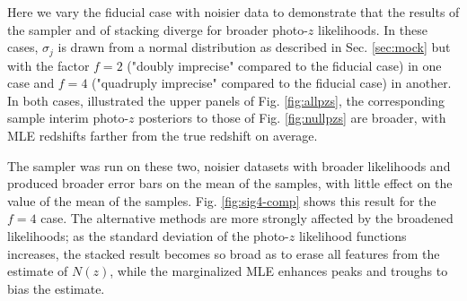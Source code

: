 \documentclass[preprint]{aastex}
\begin{document}
Here we vary the fiducial case with noisier data to demonstrate that the 
results of the sampler and of stacking diverge for broader photo-$z$ 
likelihoods.  In these cases, $\sigma_{j}$ is drawn from a normal distribution 
as described in Sec. \ref{sec:mock} but with the factor $f=2$ ("doubly 
imprecise" compared to the fiducial case) in one case and $f=4$ ("quadruply 
imprecise" compared to the fiducial case) in another.  In both cases, 
illustrated the upper panels of Fig. \ref{fig:allpzs}, the corresponding sample 
interim photo-$z$ posteriors to those of Fig. \ref{fig:nullpzs} are broader, 
with MLE redshifts farther from the true redshift on average.

The sampler was run on these two, noisier datasets with broader likelihoods and 
produced broader error bars on the mean of the samples, with little effect on 
the value of the mean of the samples.  Fig. \ref{fig:sig4-comp} shows this 
result for the $f=4$ case.  The alternative methods are more strongly affected 
by the broadened likelihoods; as the standard deviation of the photo-$z$ 
likelihood functions increases, the stacked result becomes so broad as to erase 
all features from the estimate of $N(z)$, while the marginalized MLE enhances 
peaks and troughs to bias the estimate.

%
%
\end{document}
